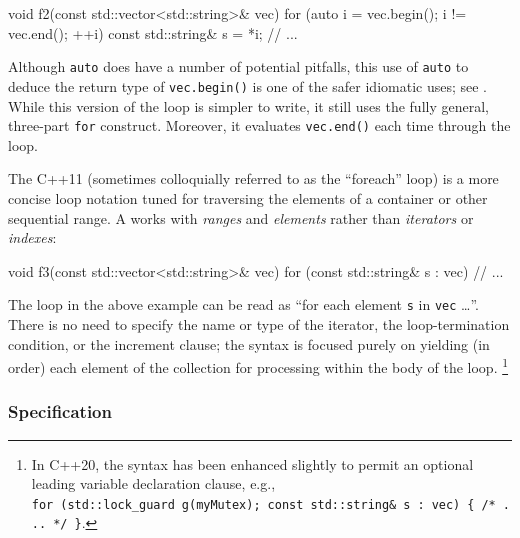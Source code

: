 \begin{emcppslisting}[emcppsbatch=e1]
void f2(const std::vector<std::string>& vec)
{
    for (auto i = vec.begin(); i != vec.end(); ++i)
    {
        const std::string& s = *i;
        // ...
    }
}
\end{emcppslisting}
    

\noindent Although \lstinline!auto! does have a number of potential pitfalls, this
use of \lstinline!auto! to deduce the return type of \lstinline!vec.begin()!
is one of the safer idiomatic uses; see . While this
version of the loop is simpler to write, it still uses the fully
general, three-part \lstinline!for! construct. Moreover, it evaluates
\lstinline!vec.end()! each time through the loop.

The C++11  (sometimes colloquially
referred to as the ``foreach'' loop) is a more concise loop notation
tuned for traversing the elements of a container or other sequential
range. A  works with \emph{ranges}
and \emph{elements} rather than \emph{iterators} or \emph{indexes}:

\begin{emcppslisting}[emcppsbatch=e1,label={iterating-over-std::vector-with-a-range-based-for-loop}]
void f3(const std::vector<std::string>& vec)
{
    for (const std::string& s : vec)
    {
        // ...
    }
}
\end{emcppslisting}
    

\noindent The loop in the above example can be read as ``for each element
\lstinline!s! in \lstinline!vec! \ldots''. There is no need to specify the
name or type of the iterator, the loop-termination condition, or the
increment clause; the syntax is focused purely on yielding (in order)
each element of the collection for processing within the body of the
loop. {\cprotect\footnote{In C++20, the syntax has been enhanced
slightly to permit an optional leading variable declaration clause,
e.g.,
  \lstinline!for!~\lstinline!(std::lock_guard!~\lstinline!g(myMutex);!~\lstinline!const!~\lstinline!std::string&!~\lstinline!s!~\lstinline!:!~\lstinline!vec)!~\lstinline!{!~\lstinline!/*!~\lstinline!...!~\lstinline!*/!~\lstinline!}!.}}

\subsubsection[Specification]{Specification}\label{specification}

